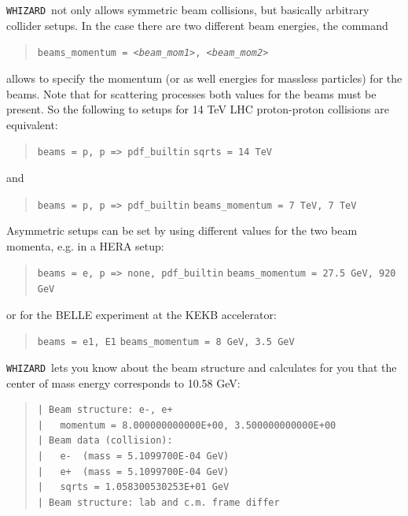 \documentclass[12pt]{book}
\newcommand{\ttt}[1]{\texttt{#1}}
\newcommand{\whizard}{\ttt{WHIZARD}}
\begin{document}
\whizard\ not only allows symmetric beam collisions, but basically
arbitrary collider setups. In the case there are two different beam
energies, the command
\begin{quote}
\begin{footnotesize}
  \ttt{beams\_momentum = {\em <beam\_mom1>}, {\em <beam\_mom2>}}
\end{footnotesize}
\end{quote}
allows to specify the momentum (or as well energies for massless
particles) for the beams. Note that for scattering processes both
values for the beams must be present. So the following to setups for
14 TeV LHC proton-proton collisions are equivalent:
\begin{quote}
\begin{footnotesize}
  \ttt{beams = p, p => pdf\_builtin} \newline
  \ttt{sqrts = 14 TeV}
\end{footnotesize}
\end{quote}
and
\begin{quote}
\begin{footnotesize}
  \ttt{beams = p, p => pdf\_builtin} \newline
  \ttt{beams\_momentum = 7 TeV, 7 TeV}
\end{footnotesize}
\end{quote}
Asymmetric setups can be set by using different values for the two
beam momenta, e.g. in a HERA setup:
\begin{quote}
\begin{footnotesize}
  \ttt{beams = e, p => none, pdf\_builtin}
  \ttt{beams\_momentum = 27.5 GeV, 920 GeV}
\end{footnotesize}
\end{quote}
or for the BELLE experiment at the KEKB accelerator:
\begin{quote}
\begin{footnotesize}
  \ttt{beams = e1, E1}
  \ttt{beams\_momentum = 8 GeV, 3.5 GeV}
\end{footnotesize}
\end{quote}
\whizard\ lets you know about the beam structure and calculates for
you that the center of mass energy corresponds to 10.58 GeV:
\begin{quote}
\begin{footnotesize}
\begin{Verbatim}
| Beam structure: e-, e+
|   momentum = 8.000000000000E+00, 3.500000000000E+00
| Beam data (collision):
|   e-  (mass = 5.1099700E-04 GeV)
|   e+  (mass = 5.1099700E-04 GeV)
|   sqrts = 1.058300530253E+01 GeV
| Beam structure: lab and c.m. frame differ
\end{Verbatim}
\end{footnotesize}
\end{quote}
\end{document}

